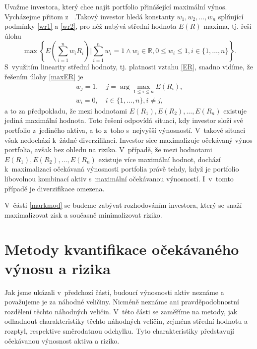 \documentclass[12pt,a4paper]{report}
\begin{document}
\bigskip
Uvažme investora, který chce najít portfolio přinášející maximální výnos. Vycházejme přitom z~\cite{markowitz} .Takový investor hledá konstanty $w_1,w_2,\dots,w_n$ splňující podmínky \eqref{wr1} a \eqref{wr2}, pro něž nabývá střední hodnota $E(R)$ maxima, tj. řeší úlohu
\begin{equation} \label{maxER}
\max\left\{ E\left(\sum_{i=1}^n w_iR_i\right) \bigg| \sum_{i=1}^n w_i = 1 \wedge w_i \in \mathbb{R}, 0 \leq w_i \leq 1,  i\in\{1,\dots,n\} \right\}.
\end{equation}
S~využitím linearity střední hodnoty, tj. platnosti vztahu \eqref{ER}, snadno vidíme, že řešením úlohy \eqref{maxER} je
\begin{gather*}
w_j=1,\quad j=\arg \max_{1 \leq i \leq n} E(R_i), \\
w_i=0,\quad i\in\{1,\dots,n\}, i \neq j, 
\end{gather*}
a to za předpokladu, že mezi hodnotami $E(R_1),E(R_2),\dots,E(R_n)$ existuje jediná maximální hodnota. Toto řešení odpovídá situaci, kdy investor složí své portfolio z~jediného aktiva, a to z~toho s~nejvyšší výnosností. V~takové situaci však nedochází k~žádné diverzifikaci. Investor sice maximalizuje očekávaný výnos portfolia, avšak bez ohledu na riziko. V~případě, že mezi hodnotami $E(R_1),E(R_2),\dots,E(R_n)$ existuje více maximální hodnot, dochází k~maximalizaci očekávaná výnosnosti portfolia právě tehdy, když je portfolio libovolnou kombinací aktiv s~maximální očekávanou výnosností. I~v~tomto případě je diverzifikace omezena. 

V~části \ref{markmod} se budeme zabývat rozhodováním investora, který se snaží maximalizovat zisk a současně minimalizovat riziko.

\bigskip






\section{Metody kvantifikace očekávaného výnosu a rizika}
Jak jsme ukázali v~předchozí části, budoucí výnosnosti aktiv neznáme a považujeme je za náhodné veličiny. Nicméně neznáme ani pravděpodobnostní rozdělení těchto náhodných veličin. V~této části se zaměříme na metody, jak odhadnout charakteristiky těchto náhodných veličin, zejména střední hodnotu a rozptyl, respektive směrodatnou odchylku. Tyto charakteristiky představují očekávanou výnosnost aktiva a riziko.
\end{document}

